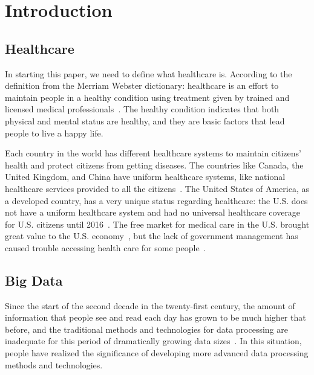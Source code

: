 
\maketitle

\section{Introduction}
\subsection{Healthcare}
In starting this paper, we need to define what healthcare is. According 
to the definition from the Merriam Webster dictionary: healthcare is an 
effort to maintain people in a healthy condition using treatment given by 
trained and licensed medical professionals~\cite{def_hc}. 
The healthy condition indicates that both 
physical and mental status are healthy, and they are basic 
factors that lead people to live a happy life. 

Each country in the world has different healthcare systems to 
maintain citizens' health and protect citizens from getting diseases. 
The countries like Canada, the United Kingdom, and China have 
uniform healthcare systems, like national healthcare services 
provided to all the citizens~\cite{ca_hc, uk_hc, cn_hc}. The 
United States of America, as a developed country, has a very unique 
status regarding healthcare: the U.S. does not have a uniform healthcare 
system and had no universal healthcare coverage for U.S. citizens until 
2016~\cite{us_hc}. The free market for medical care in the U.S. brought 
great value to the U.S. economy~\cite{us_hccost}, but the lack of 
government management has caused trouble accessing health care 
for some people~\cite{us_hcs}.

\subsection{Big Data}
Since the start of the second decade in the twenty-first century, 
the amount of information that people see and read each day has 
grown to be much higher that before, 
and the traditional methods and technologies for data processing are 
inadequate for this period of dramatically growing data 
sizes~\cite{Moura}. In this situation, people have realized the 
significance of developing more advanced data processing methods 
and technologies. 

